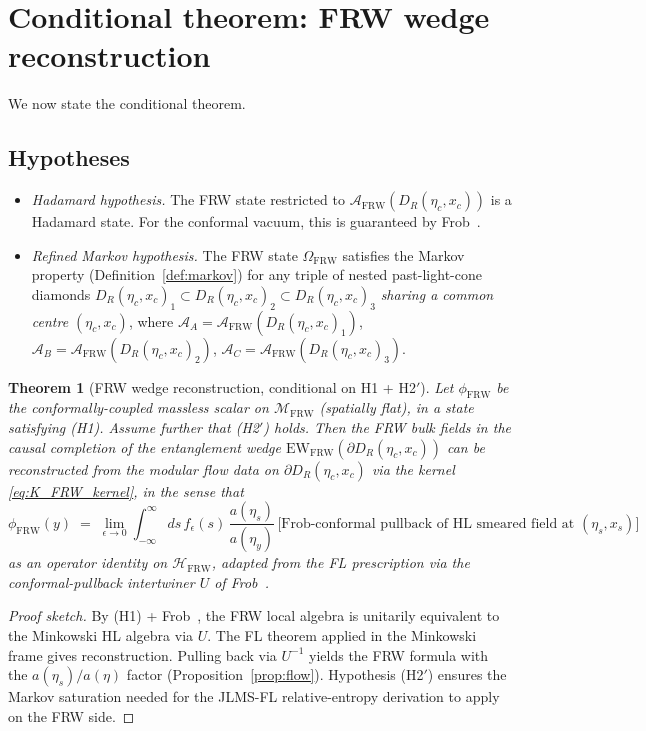 \documentclass[11pt,a4paper]{article}
\newtheorem{theorem}{Theorem}
\theoremstyle{remark}
\newcommand{\FRW}{{\mathrm{FRW}}}
\newcommand{\EW}{{\mathrm{EW}}}
\newcommand{\A}{\mathcal{A}}
\newcommand{\HH}{\mathcal{H}}
\newcommand{\DR}{D_R(\eta_c,x_c)}
\begin{document}
\section{Conditional theorem: FRW wedge reconstruction}
\label{sec:conditional_thm}

We now state the conditional theorem.

\subsection{Hypotheses}

\begin{itemize}
\item[\textbf{(H1)}] \emph{Hadamard hypothesis.}  The FRW state restricted
  to $\A_{\FRW}(\DR)$ is a Hadamard state.  For the conformal vacuum,
  this is guaranteed by Frob~\cite{Frob2023}.

\item[\textbf{(H2$'$)}] \emph{Refined Markov hypothesis.}  The FRW
  state $\Omega_{\FRW}$ satisfies the Markov property
  (Definition~\ref{def:markov}) for any triple of nested past-light-cone
  diamonds $\DR_1 \subset \DR_2 \subset \DR_3$ \emph{sharing a common
  centre $(\eta_c, x_c)$}, where $\A_A = \A_{\FRW}(\DR_1)$,
  $\A_B = \A_{\FRW}(\DR_2)$, $\A_C = \A_{\FRW}(\DR_3)$.
\end{itemize}

\begin{theorem}[FRW wedge reconstruction, conditional on H1 + H2$'$]
\label{thm:frw_wedge}
Let $\phi_{\FRW}$ be the conformally-coupled massless scalar on
$\mathcal{M}_{\FRW}$ (spatially flat), in a state satisfying (H1).  Assume
further that (H2$'$) holds.  Then the FRW bulk fields in the causal
completion of the entanglement wedge $\EW_{\FRW}(\partial\DR)$ can be
reconstructed from the modular flow data on $\partial\DR$ via the kernel
\eqref{eq:K_FRW_kernel}, in the sense that
\[
  \phi_{\FRW}(y) \;=\;
  \lim_{\epsilon\to 0}\int_{-\infty}^{\infty} ds\, f_\epsilon(s)\,
  \frac{a(\eta_s)}{a(\eta_y)}\,
  \bigl[\text{Frob-conformal pullback of HL smeared field at }(\eta_s, x_s)\bigr]
\]
as an operator identity on $\HH_{\FRW}$, adapted from the FL prescription
\cite{FaulknerLewkowycz2017} via the conformal-pullback intertwiner $U$
of Frob~\cite{Frob2023}.
\end{theorem}

\begin{proof}[Proof sketch]
By (H1) + Frob~\cite{Frob2023}, the FRW local algebra is unitarily
equivalent to the Minkowski HL algebra via $U$.  The FL theorem
\cite{FaulknerLewkowycz2017} applied in the Minkowski frame gives
reconstruction.  Pulling back via $U^{-1}$ yields the FRW formula with
the $a(\eta_s)/a(\eta)$ factor (Proposition~\ref{prop:flow}).
Hypothesis (H2$'$) ensures the Markov saturation needed for the
JLMS-FL relative-entropy derivation to apply on the FRW side.
\end{proof}
\end{document}
